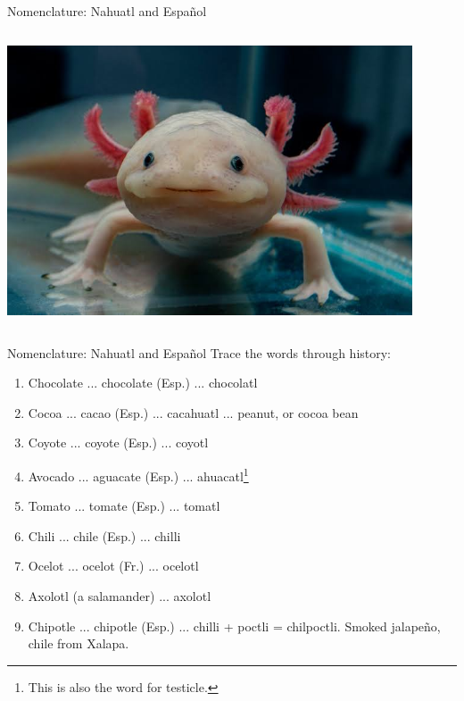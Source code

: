 \documentclass{beamer}
\begin{document}
\begin{frame}{Nomenclature: Nahuatl and Espa\~{n}ol}
\begin{columns}[T]
\begin{column}{0.35\textwidth}
\includegraphics[width=0.9\textwidth]{figures/axolotl.jpeg}
\end{column}
\end{columns}

\end{frame}

\begin{frame}{Nomenclature: Nahuatl and Espa\~{n}ol}
\small
Trace the words through history:
\begin{enumerate}
\item Chocolate ... chocolate (Esp.) ... chocolatl
\item Cocoa ... cacao (Esp.) ... cacahuatl ... peanut, or cocoa bean
\item Coyote ... coyote (Esp.) ... coyotl
\item Avocado ... aguacate (Esp.) ... ahuacatl\footnote{This is also the word for testicle.}
\item Tomato ... tomate (Esp.) ... tomatl
\item Chili ... chile (Esp.) ... chilli
\item Ocelot ... ocelot (Fr.) ... ocelotl
\item Axolotl (a salamander) ... axolotl
\item Chipotle ... chipotle (Esp.) ... chilli + poctli = chilpoctli.  Smoked jalape\~{n}o, chile from Xalapa.
\end{enumerate}
\vspace{0.5cm}
\end{frame}
\end{document}
